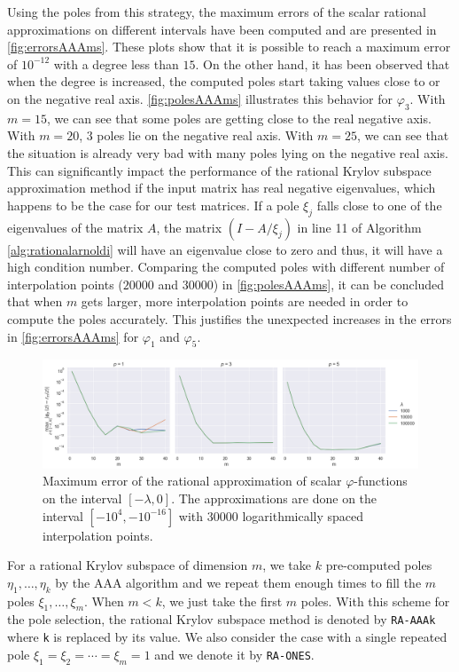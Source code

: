 Using the poles from this strategy, the maximum errors of the scalar rational approximations on different
intervals have been computed and are presented in \autoref{fig:errorsAAAms}. These plots show that
it is possible to reach a maximum error of $10^{-12}$ with a degree less than $15$.
On the other hand, it has been observed that when the degree is increased, the computed poles
start taking values close to or on the negative real axis.
\autoref{fig:polesAAAms} illustrates this behavior for $\varphi_3$.
With $m=15$, we can see that some poles are getting close to the real negative axis. With $m=20$, 3 poles
lie on the negative real axis. With $m=25$, we can see that the situation is already very bad with many
poles lying on the negative real axis.
This can significantly impact the performance of the rational Krylov subspace approximation method if the input
matrix has real negative eigenvalues, which happens to be the case for our test matrices.
If a pole $\xi_j$ falls close to one of the eigenvalues of the matrix $A$,
the matrix $(I - A/\xi_j)$ in line 11 of Algorithm \ref{alg:rationalarnoldi} will have
an eigenvalue close to zero and thus, it will have a high condition number.
Comparing the computed poles with different number of interpolation points ($20000$ and $30000$)
in \autoref{fig:polesAAAms}, it can be concluded that when $m$ gets larger, more interpolation
points are needed in order to compute the poles accurately.
This justifies the unexpected increases in the errors in \autoref{fig:errorsAAAms}
for $\varphi_1$ and $\varphi_5$.

\begin{figure}[h]
    \centering
    \includegraphics[width=.9\textwidth]{img/AAA/errors_ms_log30k.png}
    \caption{
        Maximum error of the rational approximation of scalar $\varphi$-functions
        on the interval $[-\lambda, 0]$.
        The approximations are done on the interval $[-10^4, -10^{-16}]$ with $30000$
        logarithmically spaced interpolation points.
    }
    \label{fig:errorsAAAms}
\end{figure}

For a rational Krylov subspace of dimension $m$, we take $k$ pre-computed poles $\eta_1, \dots, \eta_k$
by the AAA algorithm and we repeat them enough times to fill the $m$ poles $\xi_1, \dots, \xi_m$.
When $m < k$, we just take the first $m$ poles.
With this scheme for the pole selection, the rational Krylov subspace method is denoted by
\texttt{RA-AAAk} where \texttt{k} is replaced by its value.
We also consider the case with a single repeated pole $\xi_1 = \xi_2 = \cdots = \xi_{m} = 1$ and
we denote it by \texttt{RA-ONES}.


